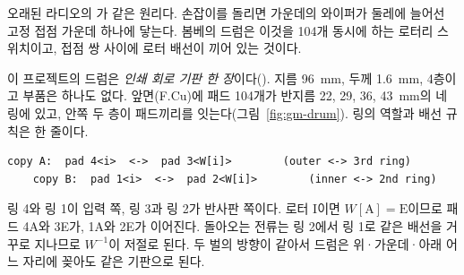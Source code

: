 \General 오래된 라디오의 가 같은 원리다. 손잡이를 돌리면 가운데의 와이퍼가
둘레에 늘어선 고정 접점 가운데 하나에 닿는다. 봄베의 드럼은 이것을 104개 동시에 하는 로터리 스위치이고,
접점 쌍 사이에 로터 배선이 끼어 있는 것이다.

\Ours 이 프로젝트의 드럼은 \emph{인쇄 회로 기판 한 장}이다(). 지름 96~mm, 두께
1.6~mm, 4층이고 부품은 하나도 없다. 앞면(F.Cu)에 패드 104개가 반지름 22, 29, 36, 43~mm의 네 링에 있고, 안쪽 두
층이 패드끼리를 잇는다(그림~\ref{fig:gm-drum}). 링의 역할과 배선 규칙은 한 줄이다.

\begin{lstlisting}[numbers=none,caption={\code{drum-pcb/README.md}: 배선 규칙. $W$는 \code{data/wirings/enigma.txt}의 로터 배선표.},label={lst:gm-drumrule}]
    copy A:  pad 4<i>  <->  pad 3<W[i]>        (outer <-> 3rd ring)
    copy B:  pad 1<i>  <->  pad 2<W[i]>        (inner <-> 2nd ring)
\end{lstlisting}

링 4와 링 1이 입력 쪽, 링 3과 링 2가 반사판 쪽이다. 로터 I이면 $W[\mathrm{A}] = \mathrm{E}$이므로 패드 4A와 3E가,
1A와 2E가 이어진다. 돌아오는 전류는 링 2에서 링 1로 같은 배선을 거꾸로 지나므로 $W^{-1}$이 저절로 된다. 두 벌의
방향이 같아서 드럼은 위·가운데·아래 어느 자리에 꽂아도 같은 기판으로 된다.

